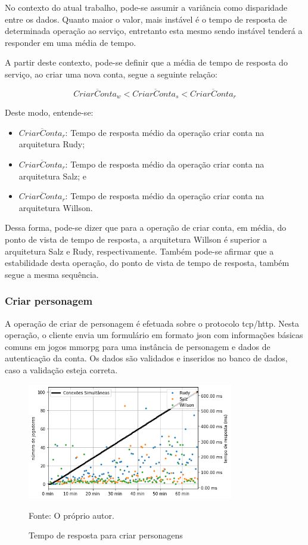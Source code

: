 No contexto do atual trabalho, pode-se assumir a variância como disparidade entre os dados.
%
Quanto maior o valor, mais instável é o tempo de resposta de determinada operação ao serviço, entretanto esta mesmo sendo instável tenderá a responder em uma média de tempo.

A partir deste contexto, pode-se definir que a média de tempo de resposta do serviço, ao criar uma nova conta, segue a seguinte relação:

$$
  \overline{CriarConta_{w}} < \overline{CriarConta_{s}} < \overline{CriarConta_{r}}
$$

Deste modo, entende-se:

\begin{itemize}
 \item $\overline{CriarConta_{r}}$: Tempo de resposta médio da operação criar conta na arquitetura Rudy;
 \item $\overline{CriarConta_{r}}$: Tempo de resposta médio da operação criar conta na arquitetura Salz; e
 \item $\overline{CriarConta_{r}}$: Tempo de resposta médio da operação criar conta na arquitetura Willson.
\end{itemize}

Dessa forma, pode-se dizer que para a operação de criar conta, em média, do ponto de vista de tempo de resposta, a arquitetura Willson é superior a arquitetura Salz e Rudy, respectivamente.
%
Também pode-se afirmar que a estabilidade desta operação, do ponto de vista de tempo de resposta, também segue a mesma sequência.

\subsubsection{Criar personagem}
\label{sec:op_create_char}

A operação de criar de personagem é efetuada sobre o protocolo \ac{tcp}/\ac{http}.
%
Nesta operação, o cliente envia um formulário em formato \ac{json} com informações básicas comuns em jogos \ac{mmorpg} para uma instância de personagem e dados de autenticação da conta.
%
Os dados são validados e inseridos no banco de dados, caso a validação esteja correta.

\begin{figure}[htb!]
  \caption{Tempo de resposta para criar personagens}
  \label{fig:create_character_operation_request}
  \includegraphics[width=0.8\textwidth]{figuras/analise/rt/create_character_operation_request.png}
  \centering

  Fonte: O próprio autor.
\end{figure}

